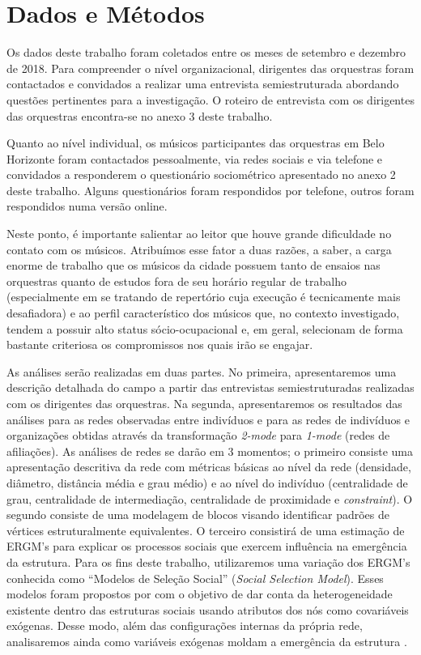 \documentclass[a4paper, 12pt, openright, oneside, german, french, english, brazil]{abntex2}
\begin{document}
	\chapter{Dados e Métodos}
	
	Os dados deste trabalho foram coletados entre os meses de setembro e dezembro de 2018. Para compreender o nível organizacional, dirigentes das orquestras foram contactados e convidados a realizar uma entrevista semiestruturada abordando questões pertinentes para a investigação. O roteiro de entrevista com os dirigentes das orquestras encontra-se no anexo 3 deste trabalho.
	
	Quanto ao nível individual, os músicos participantes das orquestras em Belo Horizonte foram contactados pessoalmente, via redes sociais e via telefone e convidados a responderem o questionário sociométrico apresentado no anexo 2 deste trabalho. Alguns questionários foram respondidos por telefone, outros foram respondidos numa versão online.
	
	Neste ponto, é importante salientar ao leitor que houve grande dificuldade no contato com os músicos. Atribuímos esse fator a duas razões, a saber, a carga enorme de trabalho que os músicos da cidade possuem tanto de ensaios nas orquestras quanto de estudos fora de seu horário regular de trabalho (especialmente em se tratando de repertório cuja execução é tecnicamente mais desafiadora) e ao perfil característico dos músicos que, no contexto investigado, tendem a possuir alto status sócio-ocupacional e, em geral, selecionam de forma bastante criteriosa os compromissos nos quais irão se engajar.
	
	As análises serão realizadas em duas partes. No primeira, apresentaremos uma descrição detalhada do campo a partir das entrevistas semiestruturadas realizadas com os dirigentes das orquestras. Na segunda, apresentaremos os resultados das análises para as redes observadas entre indivíduos e para as redes de indivíduos e organizações obtidas através da transformação \textit{2-mode} para \textit{1-mode} (redes de afiliações). As análises de redes se darão em 3 momentos; o primeiro consiste uma apresentação descritiva da rede com métricas básicas ao nível da rede (densidade, diâmetro, distância média e grau médio) e ao nível do indivíduo (centralidade de grau, centralidade de intermediação, centralidade de proximidade e \textit{constraint}). O segundo consiste de uma modelagem de blocos visando identificar padrões de vértices estruturalmente equivalentes. O terceiro consistirá de uma estimação de ERGM's para explicar os processos sociais que exercem influência na emergência da estrutura. Para os fins deste trabalho, utilizaremos uma variação dos ERGM's conhecida como ``Modelos de Seleção Social'' (\textit{Social Selection Model}). Esses modelos foram propostos por  com o objetivo de dar conta da heterogeneidade existente dentro das estruturas sociais usando atributos dos nós como covariáveis exógenas. Desse modo, além das configurações internas da própria rede, analisaremos ainda como variáveis exógenas moldam a emergência da estrutura \cite{wang2016social}.
\end{document}
